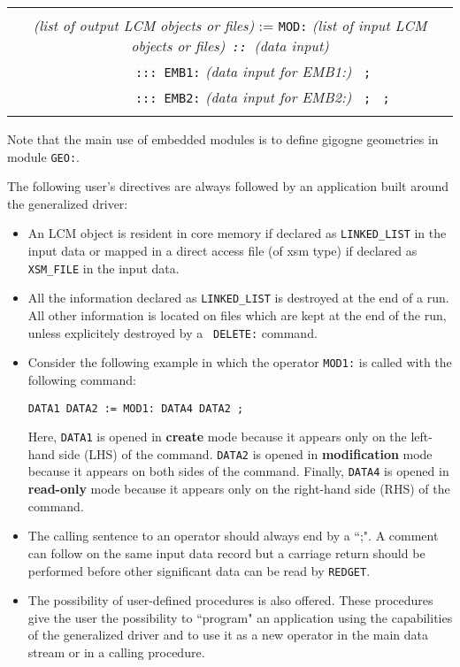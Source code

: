 \vskip 0.4cm

\noindent \begin{tabular}{|c|}
\hline \\
{\sl (list of output LCM objects or files)} := {\tt MOD:} {\sl (list of input LCM objects or files){\tt~::~}(data input)}
\\ 
 {\tt~~~~~~~~~::: EMB1:} {\sl (data input for EMB1:)} {\tt~;} {\tt~~}
\\ 
 {\tt~~~~~~~~~::: EMB2:} {\sl (data input for EMB2:)} {\tt~;} {\tt~;}
\\ \\ \hline
\end{tabular}

\vskip 0.4cm
Note that the main use of embedded modules is to define gigogne geometries in module {\tt GEO:}.

\vskip 0.4cm

The following user's directives are always followed by an application built
around the generalized driver:

\begin{itemize}
\item An LCM object is resident in core memory if
declared as {\tt LINKED\_LIST} in the input data or mapped in a direct
access file (of {\sc xsm} type) if declared as {\tt XSM\_FILE} in the
input data. 
\item All the information declared as {\tt LINKED\_LIST} is
destroyed at the end of a run. All other information is located on files which
are kept at the end of the run, unless explicitely destroyed by a {\tt
DELETE:} command. 
\item Consider the following example in which the operator {\tt MOD1:} is called with the following command: 
\begin{verbatim}
DATA1 DATA2 := MOD1: DATA4 DATA2 ; 
\end{verbatim} 
Here, {\tt DATA1} is opened in {\bf create} mode because it appears only on the left-hand side (LHS) of the
command. {\tt DATA2} is opened in {\bf modification} mode because it appears on
both sides of the command. Finally, {\tt DATA4} is opened in {\bf read-only}
mode because it appears only on the right-hand side (RHS) of the command.
\item The calling sentence to an operator should always end by a ``;". A comment
can follow on the same input data record but a carriage return should be
performed before other significant data can be read by {\tt REDGET}.
\item The possibility of user-defined procedures is also offered. These procedures
give the user the possibility to ``program" an application using the capabilities of
the generalized driver and to use it as a new operator in the main data stream or in a
calling procedure.

\end{itemize}

